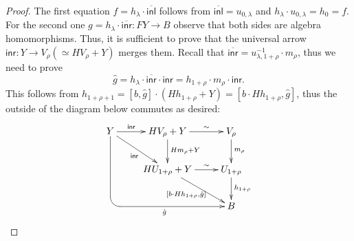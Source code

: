 \documentclass{LMCS}
\theoremstyle{plain}
\theoremstyle{definition}
\numberwithin{equation}{section}
\begin{document}
\begin{proof}
The first equation $f=h_\lambda\cdot\overline{\mathsf{inl}}$ follows
from $\overline{\mathsf{inl}}=u_{0,\lambda}$ and $h_\lambda\cdot
u_{0,\lambda}=h_0=f$. For the second one
$g=h_\lambda\cdot\overline{\mathsf{inr}}:FY\rightarrow B$ observe that
both sides are algebra homomorphisms. Thus, it is sufficient to prove
that the universal arrow $\mathsf{inr}:Y\rightarrow V_\rho(\simeq HV_\rho+Y)$ merges them. Recall that $\overline{\mathsf{inr}}=u_{\lambda,1+\rho}^{-1}\cdot m_\rho$, thus we need to prove
$$\hat g=h_\lambda\cdot\overline{\mathsf{inr}}\cdot\mathsf{inr}=h_{1+\rho}\cdot m_\rho\cdot\mathsf{inr}.$$
This follows from $h_{1+\rho+1}=[b,\hat g]\cdot(Hh_{1+\rho}+Y)=[b\cdot Hh_{1+\rho},\hat g]$, thus the outside of the diagram below commutes as desired:
$$
\xymatrix{
Y\ar`d[ddr][rrdd]_(.4){\hat g}\ar[r]^-{\mathsf{inr}}\ar[rd]_{\mathsf{inr}}&HV_\rho+Y\ar[r]^-{\sim}\ar[d]^{Hm_\rho+Y}&V_\rho\ar[d]^{m_\rho}\\
&HU_{1+\rho}+Y\ar[r]^-{\sim}\ar[rd]_{[b\cdot Hh_{1+\rho},\hat g]}&U_{1+\rho}\ar[d]^{h_{1+\rho}}\\
&&B
}
$$


\end{proof}
\end{document}
